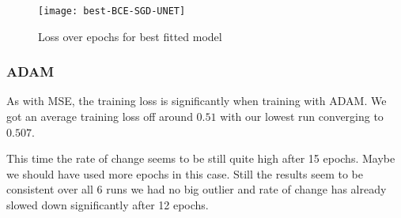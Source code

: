 \begin{figure}[h]
    \texttt{[image: best-BCE-SGD-UNET]}
    \caption{\label{im:best-BCE-SGD-UNET} Loss over epochs for best fitted model}
\end{figure}

\newpage

\subsubsection{ADAM}

As with MSE, the training loss is significantly when training with ADAM. We got an average training loss
off around $0.51$ with our lowest run converging to $0.507$.

This time the rate of change seems to be still quite high after 15 epochs. Maybe we should have used more 
epochs in this case. Still the results seem to be consistent over all 6 runs we had no big outlier and rate of 
change has already slowed down significantly after 12 epochs.


